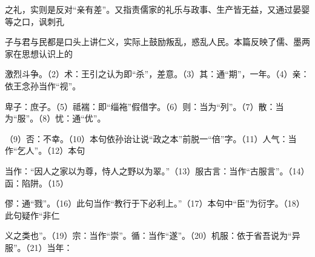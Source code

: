 \documentclass[12pt,UTF8]{ctexbook}
\begin{document}
之礼，实则是反对“亲有差”。又指责儒家的礼乐与政事、生产皆无益，又通过晏婴等之口，讽刺孔 

子与君与民都是口头上讲仁义，实际上鼓励叛乱，惑乱人民。本篇反映了儒、墨两家在思想认识上的 

激烈斗争。（2）术：王引之认为即“杀”，差意。（3）其：通“期”，一年。（4）亲：依王念孙当作“视”。 

卑子：庶子。（5）祗褍：即“缁袘”假借字。（6）则：当为“列”。（7）散：当为“服”。（8）忧：通“优”。 

（9）否：不幸。（10）本句依孙诒让说“政之本”前脱一“倍”字。（11）人气：当作“乞人”。（12）本句 

当作：“因人之家以为尊，恃人之野以为翠。”（13）服古言：当作“古服言”。（14）函：陷阱。（15） 

僇：通“戮”。（16）此句当作“教行于下必利上。”（17）本句中“臣”为衍字。（18）此句疑作“非仁 

义之类也”。（19）宗：当作“崇”。循：当作“遂”。（20）机服：依于省吾说为“异服”。（21）当年： 
\end{document}
